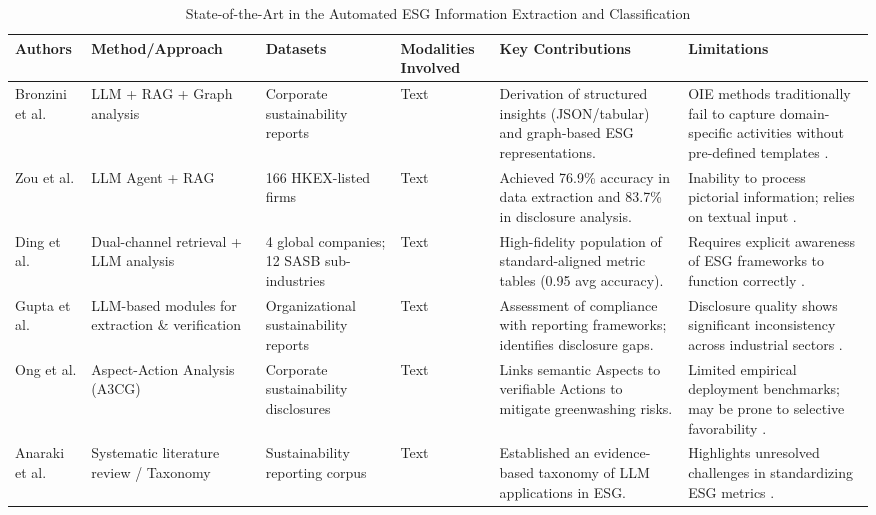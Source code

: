 \documentclass[english, online, cse, master]{dithesis}
\begin{document}
\begin{landscape}
\begin{table}[p]
\centering
\caption{State-of-the-Art in the Automated ESG Information Extraction and Classification}
\label{tab:automated-esg-extraction-classification}
\small
\renewcommand{\arraystretch}{1.2}
\begin{tabularx}{\linewidth}{|p{1.8cm}|X|X|p{1.8cm}|X|X|}
\hline
Authors & Method/Approach & Datasets & Modalities Involved & Key Contributions & Limitations \\ \hline
Bronzini et al.  \parencite{marco_bronzini_bf94d949} & LLM + RAG + Graph analysis & Corporate sustainability reports & Text & Derivation of structured insights (JSON/tabular) and graph-based ESG representations. & OIE methods traditionally fail to capture domain-specific activities without pre-defined templates  \parencite{marco_bronzini_bf94d949}. \\ \hline
Zou et al.  \parencite{yi_zou_37c055f7} & LLM Agent + RAG & 166 HKEX-listed firms & Text & Achieved 76.9\% accuracy in data extraction and 83.7\% in disclosure analysis. & Inability to process pictorial information; relies on textual input  \parencite{yi_zou_37c055f7}. \\ \hline
Ding et al.  \parencite{yi_ding_136f177b} & Dual-channel retrieval + LLM analysis & 4 global companies; 12 SASB sub-industries & Text & High-fidelity population of standard-aligned metric tables (0.95 avg accuracy). & Requires explicit awareness of ESG frameworks to function correctly  \parencite{yi_ding_136f177b}. \\ \hline
Gupta et al.  \parencite{tanay_gupta_b5c91517} & LLM-based modules for extraction \& verification & Organizational sustainability reports & Text & Assessment of compliance with reporting frameworks; identifies disclosure gaps. & Disclosure quality shows significant inconsistency across industrial sectors  \parencite{tanay_gupta_b5c91517}. \\ \hline
Ong et al.  \parencite{keane_ong_369a0b63} & Aspect-Action Analysis (A3CG) & Corporate sustainability disclosures & Text & Links semantic Aspects to verifiable Actions to mitigate greenwashing risks. & Limited empirical deployment benchmarks; may be prone to selective favorability  \parencite{keane_ong_369a0b63}. \\ \hline
Anaraki et al.  \parencite{seyed_alireza_mousavian_anaraki_b56a1c0f} & Systematic literature review / Taxonomy & Sustainability reporting corpus & Text & Established an evidence-based taxonomy of LLM applications in ESG. & Highlights unresolved challenges in standardizing ESG metrics  \parencite{seyed_alireza_mousavian_anaraki_b56a1c0f}. \\ \hline

\end{tabularx}
\end{table}
\end{landscape}
\end{document}
